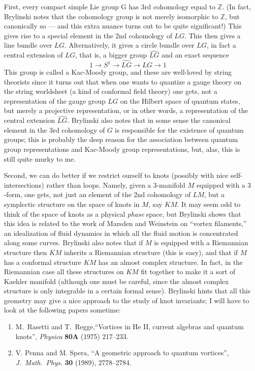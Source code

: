 \documentclass[12pt]{article}
\begin{document}
First, every compact simple Lie group G has 3rd cohomology equal to
\(\mathbb{Z}\). (In fact, Brylinski notes that the cohomology group is
not merely isomorphic to \(\mathbb{Z}\), but canonically so --- and this
extra nuance turns out to be quite significant!) This gives rise to a
special element in the 2nd cohomology of \(LG\). This then gives a line
bundle over \(LG\). Alternatively, it gives a circle bundle over \(LG\),
in fact a central extension of \(LG\), that is, a bigger group
\(\widehat{LG}\) and an exact sequence
\[1 \to S^1 \to \widehat{LG} \to LG \to 1\] This group is called a
Kac-Moody group, and these are well-loved by string theorists since it
turns out that when one wants to quantize a gauge theory on the string
worldsheet (a kind of conformal field theory) one gets, not a
representation of the gauge group \(LG\) on the Hilbert space of quantum
states, but merely a projective representation, or in other words, a
representation of the central extension \(\widehat{LG}\). Brylinski also
notes that in some sense the canonical element in the 3rd cohomology of
\(G\) is responsible for the existence of quantum groups; this is
probably the deep reason for the association between quantum group
representations and Kac-Moody group representations, but, alas, this is
still quite murky to me.

Second, we can do better if we restrict ourself to knots (possibly with
nice self-intersections) rather than loops. Namely, given a 3-manifold
\(M\) equipped with a \(3\)-form, one gets, not just an element of the
2nd cohomology of \(LM\), but a symplectic structure on the space of
knots in \(M\), say \(KM\). It may seem odd to think of the space of
knots as a physical \emph{phase} space, but Brylinski shows that this
idea is related to the work of Marsden and Weinstein on ``vortex
filaments,'' an idealization of fluid dynamics in which all the fluid
motion is concentrated along some curves. Brylinski also notes that if
\(M\) is equipped with a Riemannian structure then \(KM\) inherits a
Riemannian structure (this is easy), and that if \(M\) has a conformal
structure \(KM\) has an almost complex structure. In fact, in the
Riemannian case all these structures on \(KM\) fit together to make it a
sort of Kaehler manifold (although one must be careful, since the almost
complex structure is only integrable in a certain formal sense).
Brylinski hints that all this geometry may give a nice approach to the
study of knot invariants; I will have to look at the following papers
sometime:

\begin{enumerate}
\def\labelenumi{\arabic{enumi})}
\setcounter{enumi}{2}
\item
  M.\ Rasetti and T.\ Regge,``Vortices in He II, current algebras and quantum knots'', \emph{Physica} \textbf{80A} (1975) 217--233.
\item
   V. Penna and M. Spera, ``A geometric approach to quantum vortices'',
  \emph{J.\ Math.\ Phys.} \textbf{30} (1989), 2778--2784.
\end{enumerate}
\end{document}
